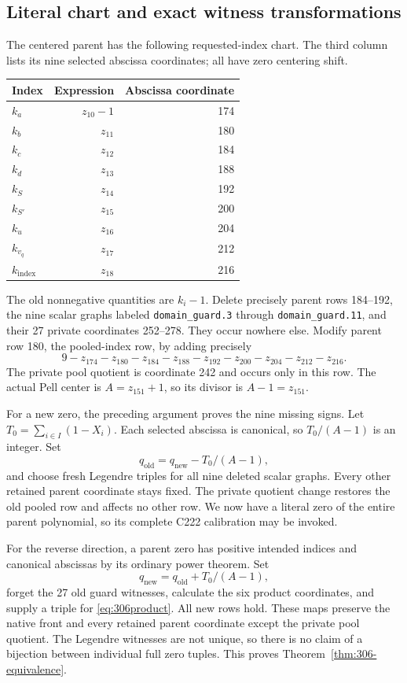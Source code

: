 \subsection{Literal chart and exact witness transformations}

The centered parent has the following requested-index chart.  The third
column lists its nine selected abscissa coordinates; all have zero
centering shift.
\begin{center}
\begin{tabular}{lrr}
\toprule
Index & Expression & Abscissa coordinate\\
\midrule
$k_a$ &$z_{10}-1$&174\\
$k_b$ &$z_{11}$&180\\
$k_c$ &$z_{12}$&184\\
$k_d$ &$z_{13}$&188\\
$k_S$ &$z_{14}$&192\\
$k_{S'}$ &$z_{15}$&200\\
$k_u$ &$z_{16}$&204\\
$k_{v_q}$ &$z_{17}$&212\\
$k_{\mathrm{index}}$ &$z_{18}$&216\\
\bottomrule
\end{tabular}
\end{center}
The old nonnegative quantities are $k_i-1$.  Delete precisely parent rows
184--192, the nine scalar graphs labeled \texttt{domain\_guard.3} through
\texttt{domain\_guard.11}, and their 27 private coordinates 252--278.
They occur nowhere else.  Modify parent row 180, the pooled-index row, by
adding precisely
\[
 9-z_{174}-z_{180}-z_{184}-z_{188}-z_{192}
   -z_{200}-z_{204}-z_{212}-z_{216}.
\]
The private pool quotient is coordinate 242 and occurs only in this row.
The actual Pell center is $A=z_{151}+1$, so its divisor is $A-1=z_{151}$.

For a new zero, the preceding argument proves the nine missing signs.
Let $T_0=\sum_{i\in I}(1-X_i)$.  Each selected abscissa is canonical,
so $T_0/(A-1)$ is an integer.  Set
\[
 q_{\mathrm{old}}=q_{\mathrm{new}}-T_0/(A-1),
\]
and choose fresh Legendre triples for all nine deleted scalar graphs.
Every other retained parent coordinate stays fixed.  The private quotient
change restores the old pooled row and affects no other row.  We now have
a literal zero of the entire parent polynomial, so its complete C222
calibration may be invoked.

For the reverse direction, a parent zero has positive intended indices
and canonical abscissas by its ordinary power theorem.  Set
\[
 q_{\mathrm{new}}=q_{\mathrm{old}}+T_0/(A-1),
\]
forget the 27 old guard witnesses, calculate the six product coordinates,
and supply a triple for \eqref{eq:306product}.  All new rows hold.  These
maps preserve the native front and every retained parent coordinate except
the private pool quotient.  The Legendre witnesses are not unique, so
there is no claim of a bijection between individual full zero tuples.
This proves Theorem~\ref{thm:306-equivalence}.

